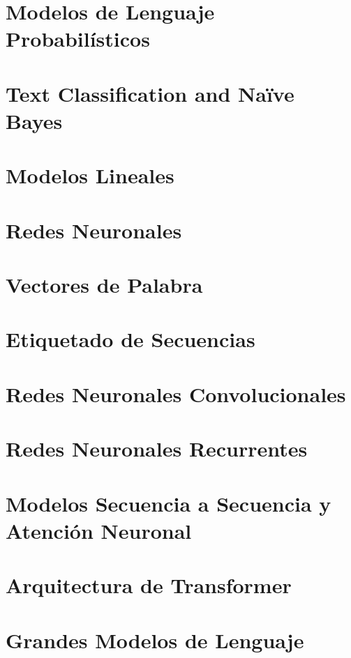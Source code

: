 \documentclass{book}
\begin{document}
\chapter{Modelos de Lenguaje Probabilísticos}
\label{cap_plm}



\chapter{Text Classification and Naïve Bayes}
\label{cap_nb}



\chapter{Modelos Lineales}
\label{cap_lineales}



\chapter{Redes Neuronales}
\label{cap_redes}


\chapter{Vectores de Palabra}
\label{cap_embeddings}



\chapter{Etiquetado de Secuencias}
\label{cap_etisec}






\chapter{Redes Neuronales Convolucionales}
\label{cap_cnn}




\chapter{Redes Neuronales Recurrentes}
\label{cap_rnn}



\chapter{Modelos Secuencia a Secuencia y Atención Neuronal}
\label{cap_sec}



\chapter{Arquitectura de Transformer}
\label{cap_trans}




        
        
\chapter{Grandes Modelos de Lenguaje}
\label{cap_llm}









\end{document}
